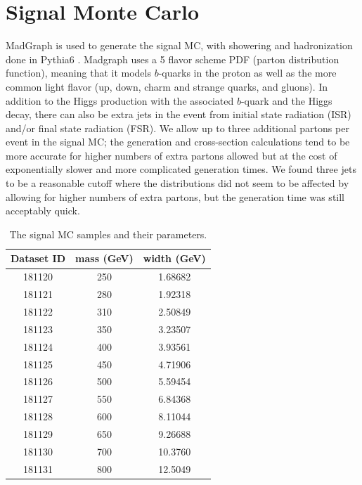 \section{Signal Monte Carlo}
MadGraph \cite{MadGraph} is used to generate the signal MC, with showering and 
hadronization done in Pythia6 \cite{Pythia6}.  Madgraph uses a 5 flavor scheme PDF 
(parton distribution function), meaning that it models $b$-quarks in the proton as 
well as the more common light flavor (up, down, charm and strange quarks, 
and gluons).  In addition to the Higgs production with the associated $b$-quark and 
the Higgs decay, there can also be extra jets in the event from initial state radiation (ISR) 
and/or final state radiation (FSR).  We allow up to three additional partons per 
event in the signal MC; the generation and cross-section calculations tend to be more 
accurate for higher numbers of extra partons allowed but at the cost of exponentially slower and more 
complicated generation times.  We found three jets to be a reasonable cutoff where the distributions did 
not seem to be affected by allowing for higher numbers of extra partons, but the generation 
time was still acceptably quick.  

\begin{table}
   \caption{The signal MC samples and their parameters. \label{tab:sig_mc_parameters} }
    \center
    \begin{tabular}{ c c c } \hline\hline
    Dataset ID & mass (GeV) & width (GeV) \\ \hline
    181120     & 250        & 1.68682 \\
    181121     & 280        & 1.92318 \\
    181122     & 310        & 2.50849 \\
    181123     & 350        & 3.23507 \\
    181124     & 400        & 3.93561 \\
    181125     & 450        & 4.71906 \\
    181126     & 500        & 5.59454 \\
    181127     & 550        & 6.84368 \\
    181128     & 600        & 8.11044 \\
    181129     & 650        & 9.26688 \\
    181130     & 700        & 10.3760 \\
    181131     & 800        & 12.5049 \\ \hline
    \end{tabular}
\end{table}

